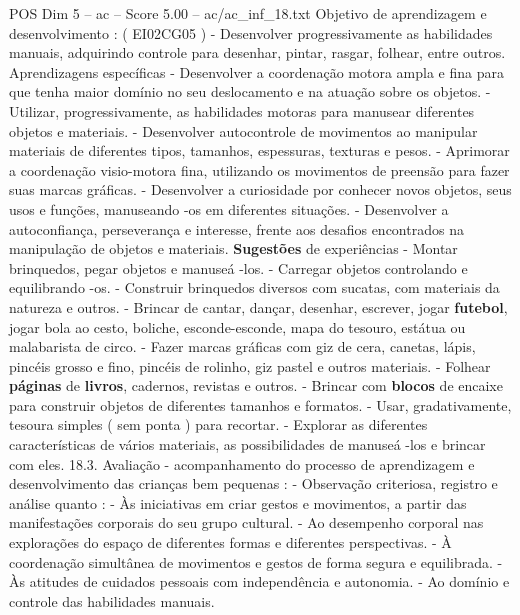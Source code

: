 \begin{textsample}{POS Dim 5 – ac – Score 5.00 – ac/ac\_inf\_18.txt}
Objetivo de aprendizagem e desenvolvimento : ( EI02CG05 ) - Desenvolver progressivamente as habilidades manuais, adquirindo controle para desenhar, pintar, rasgar, folhear, entre outros.
Aprendizagens específicas - Desenvolver a coordenação motora ampla e fina para que tenha maior domínio no seu deslocamento e na atuação sobre os objetos. - Utilizar, progressivamente, as habilidades motoras para manusear diferentes objetos e materiais. - Desenvolver autocontrole de movimentos ao manipular materiais de diferentes tipos, tamanhos, espessuras, texturas e pesos. - Aprimorar a coordenação visio-motora fina, utilizando os movimentos de preensão para fazer suas marcas gráficas. - Desenvolver a curiosidade por conhecer novos objetos, seus usos e funções, manuseando -os em diferentes situações. - Desenvolver a autoconfiança, perseverança e interesse, frente aos desafios encontrados na manipulação de objetos e materiais. \textbf{Sugestões} de experiências - Montar brinquedos, pegar objetos e manuseá -los. - Carregar objetos controlando e equilibrando -os. - Construir brinquedos diversos com sucatas, com materiais da natureza e outros. - Brincar de cantar, dançar, desenhar, escrever, jogar \textbf{futebol}, jogar bola ao cesto, boliche, esconde-esconde, mapa do tesouro, estátua ou malabarista de circo. - Fazer marcas gráficas com giz de cera, canetas, lápis, pincéis grosso e fino, pincéis de rolinho, giz pastel e outros materiais. - Folhear \textbf{páginas} de \textbf{livros}, cadernos, revistas e outros. - Brincar com \textbf{blocos} de encaixe para construir objetos de diferentes tamanhos e formatos. - Usar, gradativamente, tesoura simples ( sem ponta ) para recortar. - Explorar as diferentes características de vários materiais, as possibilidades de manuseá -los e brincar com eles. 18.3.
Avaliação - acompanhamento do processo de aprendizagem e desenvolvimento das crianças bem pequenas : - Observação criteriosa, registro e análise quanto : - Às iniciativas em criar gestos e movimentos, a partir das manifestações corporais do seu grupo cultural. - Ao desempenho corporal nas explorações do espaço de diferentes formas e diferentes perspectivas. - À coordenação simultânea de movimentos e gestos de forma segura e equilibrada. - Às atitudes de cuidados pessoais com independência e autonomia. - Ao domínio e controle das habilidades manuais.

\end{textsample}

